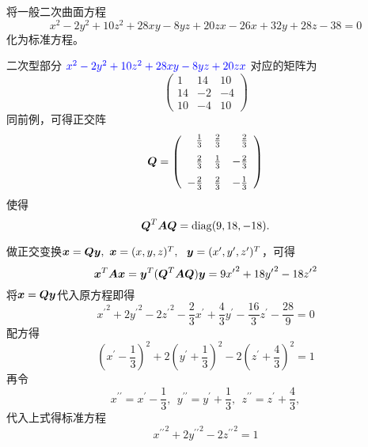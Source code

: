 \begin{frame}
  
    \begin{li}
      将一般二次曲面方程
      $$
      x^2-2y^2+10z^2+28xy-8yz+20zx-26x+32y+28z-38=0
      $$
      化为标准方程。
    \end{li}
    \pause
    \begin{jie}
    二次型部分
    $
    \textcolor{blue}{x^2-2y^2+10z^2+28xy-8yz+20zx}
    $
    对应的矩阵为
    $$
    \left(
    \begin{array}{rrr}
      1&14&10\\
      14&-2&-4\\
      10&-4&10
    \end{array}
    \right)
    $$
    同前例，可得正交阵
    $$
    \boldsymbol{Q}=\left(
    \begin{array}{rrr}
      \frac13&\frac23&\frac23\\[0.1in]
      \frac23&\frac13&-\frac23\\[0.1in]
      -\frac23&\frac23&-\frac13
    \end{array}
    \right)
    $$
    使得
    $$
    \boldsymbol{Q}^T\boldsymbol{A}\boldsymbol{Q}=\mathrm{diag}(9,18,-18).
    $$
    \end{jie}
  
\end{frame}

\begin{frame}
  
    做正交变换${\boldsymbol{x}}=\boldsymbol{Q}{\boldsymbol{y}},~{\boldsymbol{x}}=(x,y,z)^T,~~{\boldsymbol{y}}=(x^\prime,y^\prime,z^\prime)^T$，可得
    $$
    {\boldsymbol{x}}^T\boldsymbol{A}{\boldsymbol{x}}={\boldsymbol{y}}^T(\boldsymbol{Q}^T\boldsymbol{A}\boldsymbol{Q}){\boldsymbol{y}}=9{x^\prime}^2+18{y^\prime}^2-18{z^\prime}^2
    $$\pause
    将${\boldsymbol{x}}=\boldsymbol{Q}{\boldsymbol{y}}$代入原方程即得
    $$
    {x^\prime}^2+2{y^\prime}^2-2{z^\prime}^2-\frac23x^\prime+\frac43y^\prime-\frac{16}3z^\prime-\frac{28}9=0
    $$\pause
    配方得
    $$
    \left(x^\prime-\frac13\right)^2+2\left(y^\prime+\frac13\right)^2-2\left(z^\prime+\frac43\right)^2=1
    $$\pause
    再令
    $$
    x^{\prime\prime}=x^\prime-\frac13,~~
    y^{\prime\prime}=y^\prime+\frac13,~~
    z^{\prime\prime}=z^\prime+\frac43,
    $$
    代入上式得标准方程
    $$
    {x^{\prime\prime}}^2+2{y^{\prime\prime}}^2-2{z^{\prime\prime}}^2=1
    $$
  
\end{frame}
